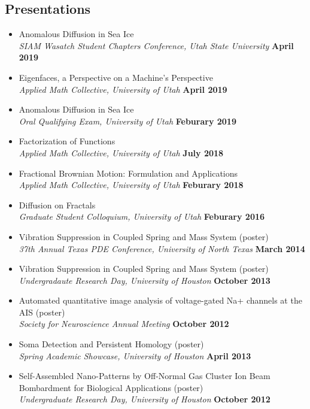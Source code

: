 \documentclass[margin,line]{res}
\begin{document}
\begin{resume}
\section{\sc Presentations}
\begin{itemize}
    \item[] Anomalous Diffusion in Sea Ice
        \\{\it SIAM Wasatch Student Chapters Conference, Utah State University} \hfill {\bf April 2019} 
    \item[] Eigenfaces, a Perspective on a Machine's Perspective
        \\{\it Applied Math Collective, University of Utah} \hfill {\bf April 2019}
    \item[] Anomalous Diffusion in Sea Ice 
        \\ {\it Oral Qualifying Exam, University of Utah } \hfill {\bf Feburary 2019} 
    \item[] Factorization of Functions
        \\ {\it Applied Math Collective, University of Utah } \hfill {\bf July 2018} 
    \item[] Fractional Brownian Motion: Formulation and Applications
        \\ {\it Applied Math Collective, University of Utah} \hfill {\bf Feburary 2018} 
    \item[] Diffusion on Fractals
        \\ {\it Graduate Student Colloquium, University of Utah} \hfill {\bf Feburary 2016} 
    \item[] Vibration Suppression in Coupled Spring and Mass System (poster)
        \\ {\it 37th Annual Texas PDE Conference, University of North Texas} \hfill {\bf March 2014} 
    \item[] Vibration Suppression in Coupled Spring and Mass System (poster)
        \\ {\it Undergradaute Research Day, University of Houston} \hfill {\bf October 2013} 
    \item[] Automated quantitative image analysis of voltage-gated Na+ channels at the AIS (poster) 
    \\ {\it Society for Neuroscience Annual Meeting} \hfill {\bf October 2012} 
    \item[] Soma Detection and Persistent Homology (poster) 
    \\ {\it Spring Academic Showcase, University of Houston} \hfill {\bf April 2013} 
    \item[] Self-Assembled Nano-Patterns by Off-Normal Gas Cluster  Ion Beam Bombardment for Biological Applications (poster) 
    \\ {\it Undergraduate Research Day, University of Houston} \hfill {\bf October 2012} 
\end{itemize}


\end{resume}
\end{document}
